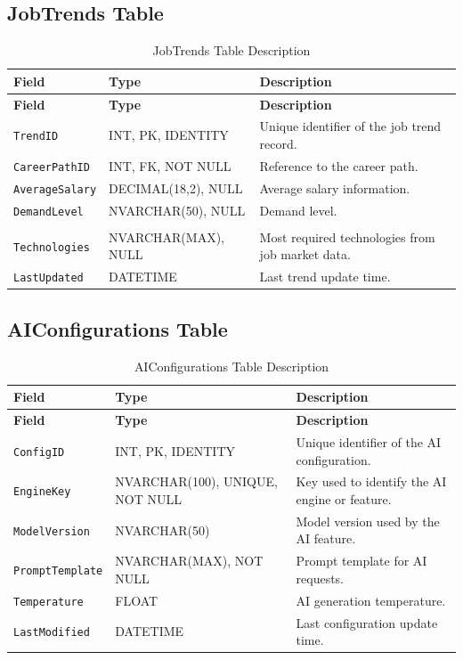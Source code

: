 \subsection{JobTrends Table}

\begin{longtable}{|>{\raggedright\arraybackslash}m{2.9cm}|>{\raggedright\arraybackslash}m{3.45cm}|>{\raggedright\arraybackslash}m{4.95cm}|}
\caption{JobTrends Table Description}
\label{tab:job_trends_table_description}
\\
\hline
\textbf{Field} & \textbf{Type} & \textbf{Description} \\
\hline
\endfirsthead
\hline
\textbf{Field} & \textbf{Type} & \textbf{Description} \\
\hline
\endhead
\texttt{TrendID} & INT, PK, IDENTITY & Unique identifier of the job trend record. \\
\hline
\texttt{CareerPathID} & INT, FK, NOT NULL & Reference to the career path. \\
\hline
\texttt{AverageSalary} & DECIMAL(18,2), NULL & Average salary information. \\
\hline
\texttt{DemandLevel} & NVARCHAR(50), NULL & Demand level. \\
\hline
\shortstack[l]{\texttt{TopRequired}\\\texttt{Technologies}} & NVARCHAR(MAX), NULL & Most required technologies from job market data. \\
\hline
\texttt{LastUpdated} & DATETIME & Last trend update time. \\
\hline
\end{longtable}

\subsection{AIConfigurations Table}

\begin{longtable}{|>{\raggedright\arraybackslash}m{2.9cm}|>{\raggedright\arraybackslash}m{3.45cm}|>{\raggedright\arraybackslash}m{4.95cm}|}
\caption{AIConfigurations Table Description}
\label{tab:ai_configurations_table_description}
\\
\hline
\textbf{Field} & \textbf{Type} & \textbf{Description} \\
\hline
\endfirsthead
\hline
\textbf{Field} & \textbf{Type} & \textbf{Description} \\
\hline
\endhead
\texttt{ConfigID} & INT, PK, IDENTITY & Unique identifier of the AI configuration. \\
\hline
\texttt{EngineKey} & NVARCHAR(100), UNIQUE, NOT NULL & Key used to identify the AI engine or feature. \\
\hline
\texttt{ModelVersion} & NVARCHAR(50) & Model version used by the AI feature. \\
\hline
\texttt{PromptTemplate} & NVARCHAR(MAX), NOT NULL & Prompt template for AI requests. \\
\hline
\texttt{Temperature} & FLOAT & AI generation temperature. \\
\hline
\texttt{LastModified} & DATETIME & Last configuration update time. \\
\hline
\end{longtable}

